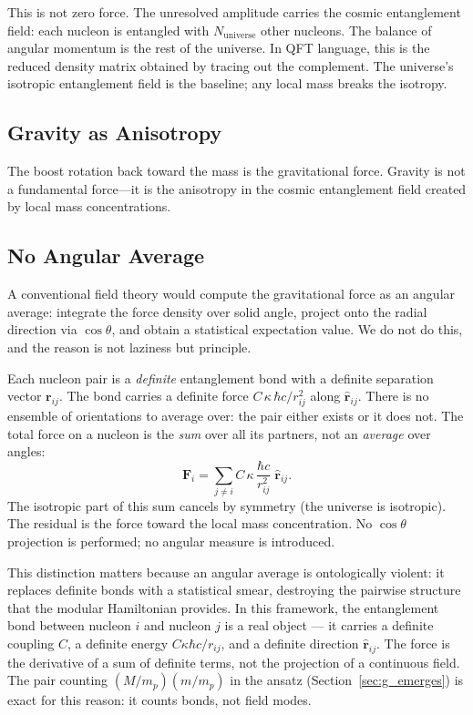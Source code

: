 \documentclass[11pt,letterpaper]{article}
\begin{document}
This is not zero force. The unresolved amplitude carries the cosmic
entanglement field: each nucleon is entangled with $N_{\mathrm{universe}}$
other nucleons. The balance of angular momentum is the rest of the universe.
In QFT language, this is the reduced density matrix obtained by tracing out
the complement. The universe's isotropic entanglement field is the baseline;
any local mass breaks the isotropy.

\subsection{Gravity as Anisotropy}

The boost rotation back toward the mass is the gravitational force. Gravity
is not a fundamental force---it is the anisotropy in the cosmic entanglement
field created by local mass concentrations.

\subsection{No Angular Average}
\label{sec:no_angular_avg}

A conventional field theory would compute the gravitational force as an
angular average: integrate the force density over solid angle, project onto
the radial direction via $\cos\theta$, and obtain a statistical expectation
value. We do not do this, and the reason is not laziness but principle.

Each nucleon pair is a \emph{definite} entanglement bond with a definite
separation vector $\mathbf{r}_{ij}$. The bond carries a definite force
$C\,\kappa\,\hbar c / r_{ij}^2$ along $\hat{\mathbf{r}}_{ij}$. There is
no ensemble of orientations to average over: the pair either exists or it
does not. The total force on a nucleon is the \emph{sum} over all its
partners, not an \emph{average} over angles:
\begin{equation}
  \mathbf{F}_i = \sum_{j \neq i} C\,\kappa\,\frac{\hbar c}{r_{ij}^2}
                 \;\hat{\mathbf{r}}_{ij}.
  \label{eq:force_sum}
\end{equation}
The isotropic part of this sum cancels by symmetry (the universe is
isotropic). The residual is the force toward the local mass
concentration. No $\cos\theta$ projection is performed; no angular
measure is introduced.

This distinction matters because an angular average is ontologically
violent: it replaces definite bonds with a statistical smear, destroying
the pairwise structure that the modular Hamiltonian provides. In this
framework, the entanglement bond between nucleon $i$ and nucleon $j$ is
a real object --- it carries a definite coupling $C$, a definite energy
$C\kappa\hbar c/r_{ij}$, and a definite direction $\hat{\mathbf{r}}_{ij}$.
The force is the derivative of a sum of definite terms, not the
projection of a continuous field. The pair counting
$(M/m_p)(m/m_p)$ in the ansatz (Section~\ref{sec:g_emerges}) is exact
for this reason: it counts bonds, not field modes.
\end{document}
